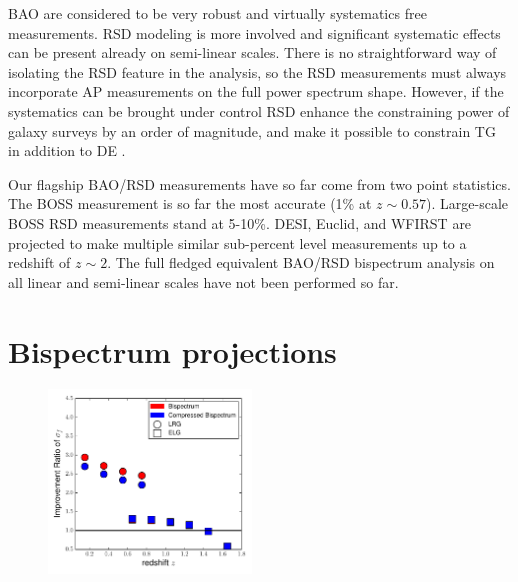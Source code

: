BAO are considered to be very robust and virtually systematics free
measurements. RSD modeling is more involved and significant systematic effects
can be present already on semi-linear scales. There is no straightforward way
of isolating the RSD feature in the analysis, so the RSD measurements must
always incorporate AP measurements on the full power spectrum shape. However,
if the systematics can be brought under control RSD enhance the constraining
power of galaxy surveys by an order of magnitude, and make it possible to
constrain TG in addition to DE \cite{2011MNRAS.410.1993S}.

Our flagship BAO/RSD measurements have so far come from two point statistics.
The BOSS measurement is so far the most accurate (1\% at $z\sim0.57$).
Large-scale BOSS RSD measurements stand at 5-10\%.  DESI, Euclid, and WFIRST are
projected to make multiple similar sub-percent level measurements up to a
redshift of $z\sim 2$. The full fledged equivalent BAO/RSD bispectrum
analysis on all linear and semi-linear scales have not been performed so
far. 

\section{Bispectrum projections}

\begin{figure}
\begin{center}
\includegraphics[width=0.48\textwidth]{fz.pdf}
\end{center}
\end{figure}



